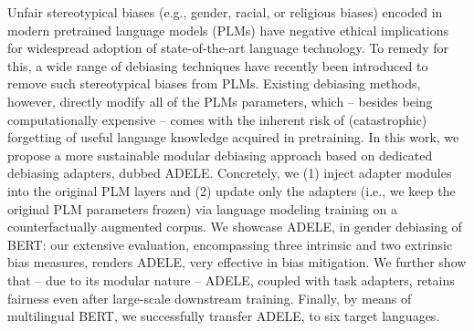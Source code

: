 Unfair stereotypical biases (e.g., gender, racial, or religious biases) encoded in modern pretrained language models (PLMs) have negative ethical implications for widespread adoption of state-of-the-art language technology. To remedy for this, a wide range of debiasing techniques have recently been introduced to remove such stereotypical biases from PLMs. Existing debiasing methods, however, directly modify all of the PLMs parameters, which -- besides being computationally expensive -- comes with the inherent risk of (catastrophic) forgetting of useful language knowledge acquired in pretraining. In this work, we propose a more sustainable modular debiasing approach based on dedicated debiasing adapters, dubbed ADELE. Concretely, we (1) inject adapter modules into the original PLM layers and (2) update only the adapters (i.e., we keep the original PLM parameters frozen) via language modeling training on a counterfactually augmented corpus. We showcase ADELE, in gender debiasing of BERT: our extensive evaluation, encompassing three intrinsic and two extrinsic bias measures, renders ADELE, very effective in bias mitigation. We further show that -- due to its modular nature -- ADELE, coupled with task adapters, retains fairness even after large-scale downstream training. Finally, by means of multilingual BERT, we successfully transfer ADELE, to six target languages.
